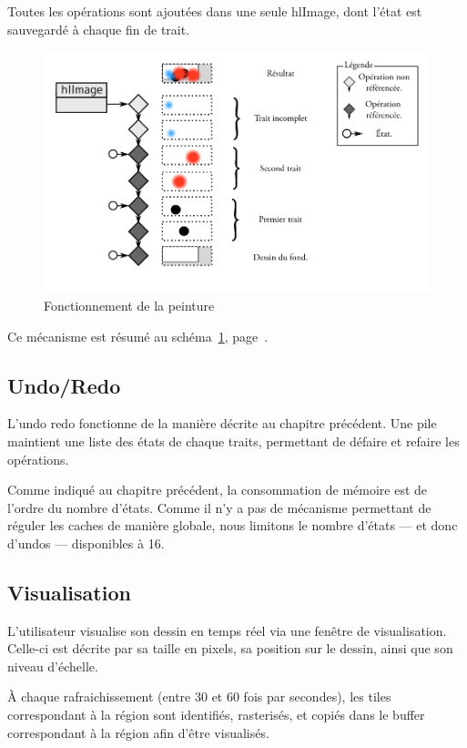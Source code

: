 			Toutes les opérations sont ajoutées dans une seule hlImage, dont l'état
			est sauvegardé à chaque fin de trait.
		\begin{figure}[ht]
			\centering
			\includegraphics[width=\textwidth]{images/draw} 
			\caption{Fonctionnement de la peinture}
			\label{fig:draw}
		\end{figure}

			Ce mécanisme est résumé au schéma~\ref{fig:draw}, page~\pageref{fig:draw}.
			
		\subsection{Undo/Redo}
			L'undo redo fonctionne de la manière décrite au chapitre précédent.
			Une pile maintient une liste des états de chaque traits, permettant de défaire
			et refaire les opérations. 

			Comme indiqué au chapitre précédent, la consommation de mémoire est de
			l'ordre du nombre d'états. Comme il n'y a pas de mécanisme permettant de
			réguler les caches de manière globale, nous limitons le nombre d'états --- et donc d'undos --- disponibles
			à 16.
		\subsection{Visualisation}
			L'utilisateur visualise son dessin en temps réel via une fenêtre de visualisation.
			Celle-ci est décrite par sa taille en pixels, sa position sur le dessin, ainsi
			que son niveau d'échelle. 
			
			À chaque rafraichissement (entre 30 et 60 fois par secondes), les tiles correspondant
			à la région sont identifiés, rasterisés, et copiés dans le buffer correspondant à la région
			afin d'être visualisés. 

